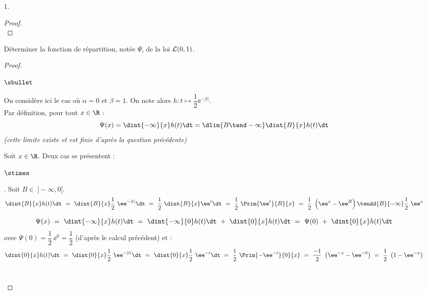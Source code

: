 \documentclass[11pt]{article}%
\begin{document}
\begin{noliste}{1.}
\begin{proof}


    ~\\[-1.2cm]
  \end{proof}

\item Déterminer la fonction de répartition, notée $\Psi$, de la loi
  ${\cal L}(0,1)$.

  \begin{proof}~%
    \begin{noliste}{$\sbullet$}
    \item On considère ici le cas où $\alpha = 0$ et $\beta = 1$. On
      note alors $h : t \mapsto \dfrac{1}{2} \ee^{-|t|}$.\\
      Par définition, pour tout $x \in \R$ :
      \[
      \Psi(x) = \dint{-\infty}{x} h(t) \dt = \dlim{B \tend -\infty}
      \dint{B}{x} h(t) \dt
      \]
      {\it (cette limite existe et est finie d'après la question
        précédente)}




    \item Soit $x \in \R$. Deux cas se présentent :
      \begin{noliste}{$\stimes$}
      \item {}. Soit $B\in \ ]-\infty, 0[$.
        \[
        \dint{B}{x} h(t) \dt \ = \ \dint{B}{x} \dfrac{1}{2} \
        \ee^{-|t|} \dt \ = \ \dfrac{1}{2} \ \dint{B}{x} \ee^{t} \dt \
        = \ \dfrac{1}{2} \ \Prim{\ee^{t}}{B}{x} \ = \ \dfrac{1}{2} \
        \left(\ee^{x} - \ee^{B} \right) \tendd{B}{-\infty}
        \dfrac{1}{2} \ \ee^{x}
        \]
        
      \item {} 
        \[
        \Psi(x) \ = \ \dint{-\infty}{x} h(t) \dt \ = \
        \dint{-\infty}{0} h(t) \dt \ + \ \dint{0}{x} h(t) \dt \ = \
        \Psi(0) \ + \ \dint{0}{x} h(t) \dt
        \]
        avec $\Psi(0) = \dfrac{1}{2} \ \ee^{0} = \dfrac{1}{2}$
        (d'après le calcul précédent) et :
        \[
        \dint{0}{x} h(t) \dt \ = \ \dint{0}{x}
        \dfrac{1}{2} \ \ee^{-|t|} \dt \ = \ \dint{0}{x} \dfrac{1}{2} \
        \ee^{-t} \dt \ = \ \dfrac{1}{2} \ \Prim{-\ee^{-t}}{0}{x} \ = \
        \dfrac{-1}{2} \ \left(\ee^{-x} - \ee^{-0} \right) \ = \
        \dfrac{1}{2} \ \left(1 - \ee^{-x} \right)
        \]
        ~\\[-1.2cm]
      \end{noliste}      
    \end{noliste}
  \end{proof}
  

\end{noliste}
\end{document}
